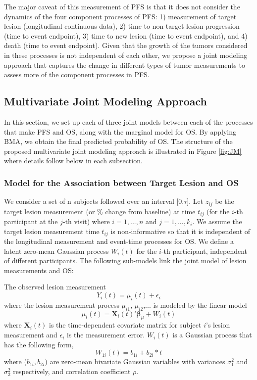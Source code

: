 The major caveat of this measurement of \ac{PFS} is that it does not consider the dynamics of the four component processes of \ac{PFS}: 1) measurement of target lesion (longitudinal continuous data), 2) time to non-target lesion progression (time to event endpoint), 3) time to new lesion (time to event endpoint), and 4) death (time to event endpoint). Given that the growth of the tumors considered in these processes is not independent of each other, we propose a joint modeling approach that captures the change in different types of tumor measurements to assess more of the component processes in \ac{PFS}. 

\subsection{Multivariate Joint Modeling Approach}
\label{sec:jm}

In this section, we set up each of three joint models between each of the processes that make \ac{PFS} and \ac{OS}, along with the marginal model for \ac{OS}. By applying \ac{BMA}, we obtain the final predicted probability of \ac{OS}. The structure of the proposed multivariate joint modeling approach is illustrated in Figure \ref{fig:JM} where details follow below in each subsection.

\subsubsection{Model for the Association between Target Lesion and OS}

We consider a set of n subjects followed over an interval [0,$\tau$]. Let $z_{ij}$ be the target lesion measurement (or \% change from baseline) at time $t_{ij}$ (for the $i$-th participant at the $j$-th visit) where $i=1,...,n$ and $j=1,...,k_i$. We assume the target lesion measurement time $t_{ij}$ is non-informative so that it is independent of the longitudinal measurement and event-time processes for \ac{OS}. We define a latent zero-mean Gaussian process $W_i(t)$ for the $i$-th participant, independent of different participants. The following sub-models link the joint model of lesion measurements and \ac{OS}:

The observed lesion measurement
$$Y_{i}(t)=\mu_{i}(t)+\epsilon_i$$
where the lesion measurement process $\mu_{i1}$, $\mu_{i2}$,...
is modeled by the linear model
$$\mu_{i}(t)=\textbf{X}_i(t)' \boldsymbol{\beta}_{\mu}+W_{i}(t)$$
where $\textbf{X}_i(t)$ is the time-dependent covariate matrix for subject $i$'s lesion measurement and $\epsilon_i$ is the measurement error. $W_i(t)$ is a Gaussian process that has the following form,
$$W_{1i}(t)=b_{1i}+b_{2i}*t$$
where ($b_{1i},b_{2i}$) are zero-mean bivariate Gaussian variables with variances $\sigma_1^2$ and $\sigma_2^2$ respectively, and correlation coefficient $\rho$. 

